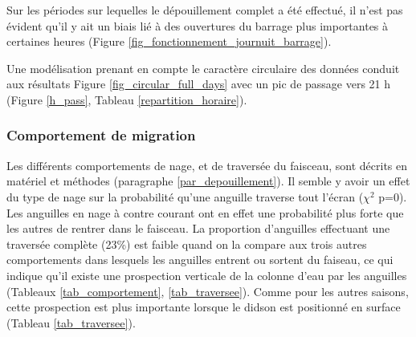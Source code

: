 \documentclass[11pt,twocolumn,titlepage,twoside]{article}
\newlength\defaultparindent
\begin{document}
Sur les périodes sur lequelles le dépouillement complet a été effectué, il
n'est pas évident qu'il y ait un biais lié à des ouvertures du barrage plus
importantes à certaines heures (Figure \ref{fig_fonctionnement_journuit_barrage}).


Une modélisation prenant en compte le caractère circulaire des données conduit
aux résultats Figure \ref{fig_circular_full_days} avec un pic de passage vers 21
h (Figure \ref{h_pass}, Tableau \ref{repartition_horaire}).




\subsubsection{Comportement de migration}
Les différents comportements de nage, et de traversée du faisceau, sont décrits
en matériel et méthodes (paragraphe \ref{par_depouillement}). Il semble y avoir
un effet du type de nage sur la probabilité qu'une anguille traverse tout l'écran ($\chi ^2$
p=\textcolor{grisbleufonce}{0)}.
Les anguilles en nage à contre courant ont en effet une probabilité plus forte que les autres de
rentrer dans le faisceau. La proportion d'anguilles effectuant une 
traversée complète
(\textcolor{grisbleufonce}{23}\%) est faible quand on la
compare aux trois autres comportements dans lesquels les anguilles entrent ou
sortent du faiseau, ce qui indique qu'il existe une prospection
verticale de la colonne d'eau par les anguilles (Tableaux \ref{tab_comportement}, \ref{tab_traversee}).
Comme pour les autres saisons, cette prospection est plus importante lorsque le didson est positionné en surface (Tableau \ref{tab_traversee}).



\end{document}
